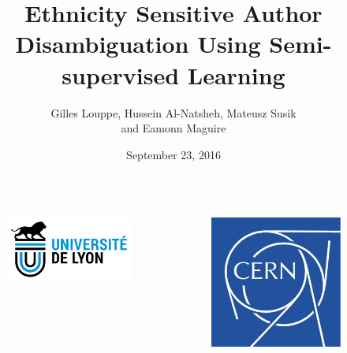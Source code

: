 \documentclass{beamer}
\title{\bf Ethnicity Sensitive Author Disambiguation Using Semi-supervised Learning}
\author{Gilles Louppe, Hussein Al-Natsheh, Mateusz Susik \\and 
Eamonn Maguire}
\institute{KESW 2016, Prague}
\date{September 23, 2016}
\begin{document}
\begin{frame}
\titlepage
   \centering
   \begin{columns}[T]
    \begin{column}{0.33\textwidth}
    \begin{figure}
        \includegraphics[height=.2\textheight]{./figures/uod.png}
    \end{figure}
    \end{column}
    \begin{column}{0.33\textwidth}
    \begin{figure}
        \includegraphics[height=.2\textheight]{./figures/cern.png}
    \end{figure}
    \end{column}

\end{columns}
\end{frame}
\end{document}
